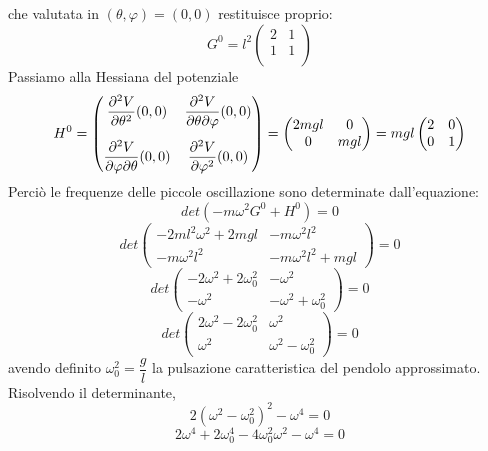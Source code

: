 \documentclass[a4paper,openany]{article}
\begin{document}
	che valutata in $(\theta,\varphi)=(0,0)$ restituisce proprio:
	\begin{equation}
		G^0 = l^2
		\begin{pmatrix}
			2 & 1 \\
			1 & 1 \\
		\end{pmatrix}
	\end{equation}
	Passiamo alla Hessiana del potenziale
	\begin{equation}\label{key}
		H^0 =
		\begin{pmatrix}
			\dfrac{\partial ^2 V}{\partial \theta^2}(0,0) & \dfrac{\partial ^2 V}{\partial \theta\partial \varphi}(0,0)
			\vspace{3mm} \\ 
			\dfrac{\partial ^2 V}{\partial \varphi\partial \theta}(0,0) & 	\dfrac{\partial ^2 V}{\partial \varphi^2}(0,0)
		\end{pmatrix} = 
		\begin{pmatrix}
			2mgl & 0 \\
			0 & mgl \\
		\end{pmatrix} = 
		mgl
		\begin{pmatrix}
			2 & 0 \\
			0 & 1 \\
		\end{pmatrix}
	\end{equation}
	Perciò le frequenze delle piccole oscillazione sono determinate dall'equazione:
	$$
	det(-m\omega^{2}G^0+H^0) = 0
	$$
	$$
	det
	\begin{pmatrix}
		-2ml^2\omega^2 + 2mgl & -m\omega^{2}l^2 \\
		-m\omega^{2}l^{2} & -m\omega^{2}l^2+mgl
	\end{pmatrix} = 0
	$$
	$$
	det
	\begin{pmatrix}
		-2\omega^2 + 2\omega_0^2 & -\omega^{2} \\
		-\omega^{2} & -\omega^{2}+ \omega_0^2
	\end{pmatrix} = 0
	$$
	$$
	det
	\begin{pmatrix}
		2\omega^2 - 2\omega_0^2 & \omega^{2} \\
		\omega^{2} & \omega^{2} - \omega_0^2
	\end{pmatrix} = 0
	$$
	avendo definito $\omega_{0}^{2} = \dfrac{g}{l}$ la pulsazione caratteristica del pendolo approssimato. Risolvendo il determinante, 
	$$
	2(\omega^{2}-\omega_{0}^{2})^2- \omega^{4} = 0
	$$
	$$
	2\omega^{4}+2\omega_{0}^{4} - 4\omega_{0}^2\omega^{2} - \omega^{4} = 0
	$$
\end{document}
